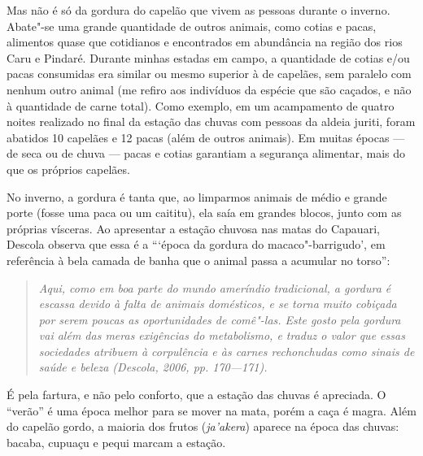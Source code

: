 Mas não é só da gordura do capelão que vivem as pessoas durante o
inverno. Abate"-se uma grande quantidade de outros animais, como cotias e
pacas, alimentos quase que cotidianos e encontrados em abundância na
região dos rios Caru e Pindaré. Durante minhas estadas em campo, a
quantidade de cotias e/ou pacas consumidas era similar ou mesmo superior
à de capelães, sem paralelo com nenhum outro animal (me refiro aos
indivíduos da espécie que são caçados, e não à quantidade de carne
total). Como exemplo, em um acampamento de quatro noites realizado no
final da estação das chuvas com pessoas da aldeia juriti, foram abatidos
10 capelães e 12 pacas (além de outros animais). Em muitas épocas --- de
seca ou de chuva --- pacas e cotias garantiam a segurança alimentar, mais
do que os próprios capelães.

No inverno, a gordura é tanta que, ao limparmos animais de médio e
grande porte (fosse uma paca ou um caititu), ela saía em grandes blocos,
junto com as próprias vísceras. Ao apresentar a estação chuvosa nas
matas do Capauari, Descola observa que essa é a ```época da gordura do
macaco"-barrigudo', em referência à bela camada de banha que o animal
passa a acumular no torso'':

\begin{quote}
\emph{Aqui, como em boa parte do mundo ameríndio tradicional, a gordura é
escassa devido à falta de animais domésticos, e se torna muito cobiçada
por serem poucas as oportunidades de comê"-las. Este gosto pela gordura
vai além das meras exigências do metabolismo, e traduz o valor que essas
sociedades atribuem à corpulência e às carnes rechonchudas como sinais
de saúde e beleza (Descola, 2006, pp. 170---171).}
\end{quote}

É pela fartura, e não pelo conforto, que a estação das chuvas é
apreciada. O ``verão'' é uma época melhor para se mover na mata, porém a
caça é magra. Além do capelão gordo, a maioria dos frutos
(\emph{ja'akera}) aparece na época das chuvas: bacaba, cupuaçu e pequi
marcam a estação.

